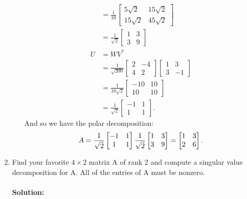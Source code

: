 \documentclass{article}
\begin{document}
\begin{enumerate}
\begin{enumerate}[label= (\alph*)]
\begin{align*}
           &= \frac{1}{10}\begin{bmatrix} 5\sqrt{2} &15\sqrt{2}\\ 15\sqrt{2} &45\sqrt{2} \end{bmatrix}  \\
           &= \frac{1}{\sqrt{2} }\begin{bmatrix} 1&3\\ 3&9\end{bmatrix}  \\
        U&=WV^* \\
         &=\frac{1}{\sqrt{200} }\begin{bmatrix} 2&-4 \\4 &2 \end{bmatrix} \begin{bmatrix} 1&3\\3&-1 \end{bmatrix} \\
         &= \frac{1}{10\sqrt{2} } \begin{bmatrix} -10& 10\\10&10 \end{bmatrix} \\
         &= \frac{1}{\sqrt{2} } \begin{bmatrix} -1& 1\\1&1 \end{bmatrix}
    .\end{align*}
    And so we have the polar decomposition:
    \[
        A=\frac{1}{\sqrt{2} } \begin{bmatrix} -1& 1\\1&1 \end{bmatrix}\frac{1}{\sqrt{2} }\begin{bmatrix} 1&3\\ 3&9\end{bmatrix} =\begin{bmatrix} 1&3\\2&6 \end{bmatrix}  \\
    .\] 
\end{enumerate}

\item Find your favorite $4 \times  2$ matrix A of rank 2 and compute a singular value decomposition for A. All of the entries of A must be nonzero.

    \paragraph{Solution: }%


\end{enumerate}
\end{document}
